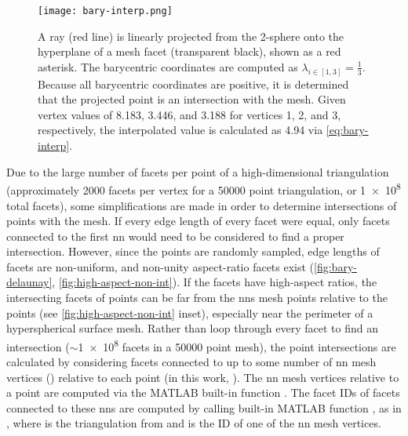 \documentclass[final,12pt]{elsarticle}
\begin{document}
\begin{figure}
	\centering
	\texttt{[image: bary-interp.png]}
	\caption{A ray (red line) is linearly projected from the 2-sphere onto the hyperplane of a mesh facet (transparent black), shown as a red asterisk. The barycentric coordinates are computed as $\lambda_{i \in [1,3]} = \frac{1}{3}$. Because all barycentric coordinates are positive, it is determined that the projected point is an intersection with the mesh. Given vertex values of \num{8.183}, \num{3.446}, and \num{3.188} for vertices 1, 2, and 3, respectively, the interpolated value is calculated as \num{4.94} via \cref{eq:bary-interp}.}
	\label{fig:bary-interp}
\end{figure}
%
%
Due to the large number of facets per point of a high-dimensional triangulation (approximately \num{2000} facets per vertex for a \num{50000} point triangulation, or \num{1e8} total facets), some simplifications are made in order to determine intersections of \outpt{} points with the mesh. If every edge length of every facet were equal, only facets connected to the first \gls{nn} would need to be considered to find a proper intersection. However, since the points are randomly sampled, edge lengths of facets are non-uniform, and non-unity aspect-ratio facets exist (\cref{fig:bary-delaunay}, \cref{fig:high-aspect-non-int}). If the facets have high-aspect ratios, the intersecting facets of \outpt{} points can be far from the \glspl{nn} mesh points relative to the \outpt{} points (see \cref{fig:high-aspect-non-int} inset), especially near the perimeter of a hyperspherical surface mesh. Rather than loop through every facet to find an intersection ($\sim$\num{1e8} facets in a \num{50000} point mesh), the \outpt{} point intersections are calculated by considering facets connected to up to some number of \gls{nn} mesh vertices () relative to each \outpt{} point (in this work, ). The \gls{nn} mesh vertices relative to a \outpt{} point are computed via the MATLAB built-in function . The facet IDs of facets connected to these \glspl{nn} are computed by calling built-in MATLAB function , as in , where  is the triangulation from  and  is the ID of one of the \gls{nn} mesh vertices. 
\end{document}
